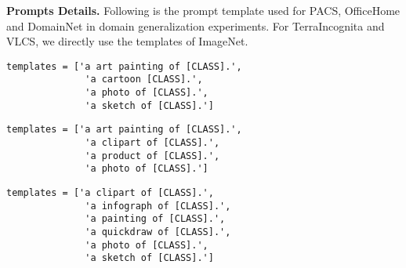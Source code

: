 \documentclass[pdflatex,sn-basic,iicol]{sn-jnl}
\theoremstyle{thmstyleone}\newtheorem{theorem}{Theorem}\newtheorem{proposition}[theorem]{Proposition}
\theoremstyle{thmstyletwo}\newtheorem{example}{Example}\newtheorem{remark}{Remark}
\theoremstyle{thmstylethree}\newtheorem{definition}{Definition}
\begin{document}
\noindent\textbf{Prompts Details.} Following is the prompt template used for PACS, OfficeHome and DomainNet in domain generalization experiments. For TerraIncognita and VLCS, we directly use the templates of ImageNet. 

\begin{lstlisting}[caption=Templates for PACS]
templates = ['a art painting of [CLASS].',
              'a cartoon [CLASS].',
              'a photo of [CLASS].',
              'a sketch of [CLASS].']
\end{lstlisting}

\begin{lstlisting}[caption=Templates for OfficeHome]
templates = ['a art painting of [CLASS].',
              'a clipart of [CLASS].',
              'a product of [CLASS].',
              'a photo of [CLASS].']
\end{lstlisting}

\begin{lstlisting}[caption=Templates for DomainNet]
templates = ['a clipart of [CLASS].',
              'a infograph of [CLASS].',
              'a painting of [CLASS].',
              'a quickdraw of [CLASS].',
              'a photo of [CLASS].',
              'a sketch of [CLASS].']
\end{lstlisting}
\end{document}
